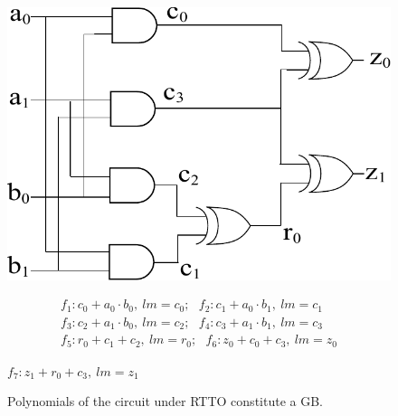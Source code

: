 \begin{figure}[!h]
\begin{minipage}[t]{3.25in}
\centerline{
\includegraphics[scale=0.5]{2bitmultiplier_gates.pdf}
}
\caption{\small A 2-bit modulo Multiplier circuit. 
  } 
\label{fig:mul2bit}
\end{minipage}
\hfill
\begin{minipage}[t]{3.25in}
\vspace{0pt}
\begin{align*}
f_1: c_0+a_0 \cdot b_0, \ lm=c_0; ~~~f_2: c_1+a_0 \cdot b_1, \ lm=c_1 \nonumber \\
f_3: c_2+a_1 \cdot b_0, \ lm=c_2; ~~~f_4: c_3+a_1 \cdot b_1, \ lm=c_3 \nonumber \\
f_5: r_0+c_1 + c_2 , \ lm=r_0; ~~~f_6: z_0+c_0 + c_3, \ lm=z_0\nonumber
\end{align*}
\vspace{-0.35in}
\begin{center}
$f_7: z_1+r_0 + c_3, \ lm=z_1$ %
\end{center}
\caption{\small {Polynomials of the circuit under RTTO constitute a GB.
}} 
\label{fig:rel_prime_lt}
\end{minipage}

\end{figure}

